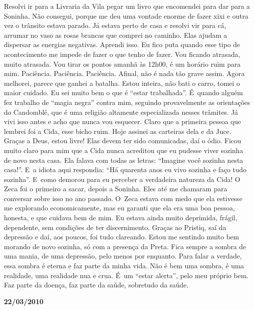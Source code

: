 Resolvi ir para a Livraria da Vila pegar um livro que encomendei para
dar para a Soninha. Não consegui, porque me deu uma vontade enorme de
fazer xixi e outra vez o trânsito estava parado. Já estava perto de casa
e resolvi vir para cá, arrumar no vaso as rosas brancas que comprei no
caminho. Elas ajudam a dispersar as energias negativas. Aprendi isso. Eu
fico puta quando esse tipo de acontecimento me impede de fazer o que
tenho de fazer. Vou ficando atrasada, muito atrasada. Vou tirar os
pontos amanhã às 12h00, é um horário ruim para mim. Paciência.
Paciência. Paciência. Afinal, não é nada tão grave assim. Agora melhorei,
parece que ganhei a batalha. Estou inteira, não bati o carro, tomei o
maior cuidado. Eu sei muito bem o que é ``estar trabalhada''. É~quando
alguém fez trabalho de ``magia negra'' contra mim, seguindo
provavelmente as orientações do Candomblé, que é uma religião altamente
especializada nesses trâmites. Já vivi isso antes e acho que nunca vou
esquecer. Claro que a primeira pessoa que lembrei foi a Cida, esse bicho
ruim. Hoje assinei as carteiras dela e da Juce. Graças a Deus, estou
livre! Elas devem ter sido comunicadas, daí o ódio. Ficou muito claro
para mim que a Cida nunca acreditou que eu pudesse viver sozinha de novo
nesta casa. Ela falava com todas as letras: ``Imagine você sozinha nesta
casa!''. E~a idiota aqui respondia: ``Há quarenta anos eu vivo sozinha e
faço tudo sozinha''. E~como demorou para eu perceber a verdadeira
natureza da Cida! O Zeca foi o primeiro a sacar, depois a Soninha. Eles
até me chamaram para conversar sobre isso no ano passado. O~Zeca estava
com medo que ela estivesse me explorando economicamente, mas eu garanti
que ela era uma boa pessoa, honesta, e que cuidava bem de mim. Eu estava
ainda muito deprimida, frágil, dependente, sem condições de ter
discernimento. Graças ao Pristiq, saí da depressão e daí, aos poucos,
foi tudo clareando. Estou me sentindo muito bem morando de novo sozinha,
só com a presença da Preta. Fica sempre a sombra de uma mania, de uma
depressão, pelo menos por enquanto. Para falar a verdade, essa sombra é
eterna e faz parte da minha vida. Não é bem uma sombra, é uma realidade,
uma realidade nua e crua. É~um ``estar alerta'', pelo meu próprio bem.
Faz parte da doença, faz parte da saúde, sobretudo da saúde.

\begin{center}\textbf{\asterisc{}}\end{center}


\begin{flushright}\textbf{22/03/2010}\end{flushright}


